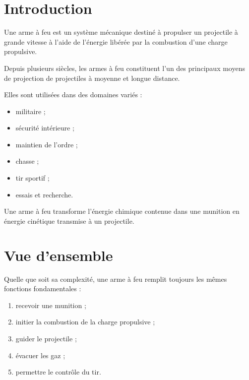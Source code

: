 
\section{Introduction}

Une arme à feu est un système mécanique destiné à propulser un projectile
à grande vitesse à l'aide de l'énergie libérée par la combustion d'une
charge propulsive.

Depuis plusieurs siècles, les armes à feu constituent l'un des principaux
moyens de projection de projectiles à moyenne et longue distance.

Elles sont utilisées dans des domaines variés :

\begin{itemize}
    \item militaire ;
    \item sécurité intérieure ;
    \item maintien de l'ordre ;
    \item chasse ;
    \item tir sportif ;
    \item essais et recherche.
\end{itemize}

\begin{aretenir}

Une arme à feu transforme l'énergie chimique contenue dans une munition en
énergie cinétique transmise à un projectile.

\end{aretenir}

\section{Vue d'ensemble}

Quelle que soit sa complexité, une arme à feu remplit toujours les mêmes
fonctions fondamentales :

\begin{enumerate}
    \item recevoir une munition ;
    \item initier la combustion de la charge propulsive ;
    \item guider le projectile ;
    \item évacuer les gaz ;
    \item permettre le contrôle du tir.
\end{enumerate}

